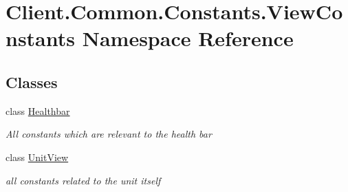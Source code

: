 \hypertarget{namespaceClient_1_1Common_1_1Constants_1_1ViewConstants}{}\section{Client.\+Common.\+Constants.\+View\+Constants Namespace Reference}
\label{namespaceClient_1_1Common_1_1Constants_1_1ViewConstants}
\subsection*{Classes}
\begin{DoxyCompactItemize}
\item 
class \hyperlink{classClient_1_1Common_1_1Constants_1_1ViewConstants_1_1Healthbar}{Healthbar}
\begin{DoxyCompactList}\small\item\em All constants which are relevant to the health bar \end{DoxyCompactList}\item 
class \hyperlink{classClient_1_1Common_1_1Constants_1_1ViewConstants_1_1UnitView}{Unit\+View}
\begin{DoxyCompactList}\small\item\em all constants related to the unit itself \end{DoxyCompactList}\end{DoxyCompactItemize}

